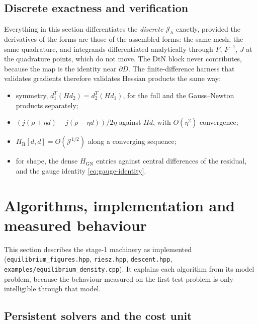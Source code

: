 \documentclass[11pt]{article}
\newcommand{\Jf}{\mathscr{J}}  %
\begin{document}
\subsection{Discrete exactness and verification}

Everything in this section differentiates the \emph{discrete} $\Jf _h$
exactly, provided the derivatives of the forms are those of the
assembled forms: the same mesh, the same quadrature, and integrands
differentiated analytically through $F$, $F^{-1}$, $J$ at the quadrature
points, which do not move. The DtN block never contributes, because the
map is the identity near $\partial D$. The finite-difference harness that
validates gradients therefore validates Hessian products the same way:
\begin{itemize}
\item symmetry, $d_1^{T}(Hd_2) = d_2^{T}(Hd_1)$, for the full and the
  Gauss--Newton products separately;
\item $(j(\rho + \eta d) - j(\rho - \eta d))/2\eta$ against $Hd$, with
  $O(\eta^2)$ convergence;
\item $H_{\mathrm{R}}[d,d] = O(\Jf ^{1/2})$ along a converging sequence;
\item for shape, the dense $H_{\mathrm{GN}}$ entries against central
  differences of the residual, and the gauge identity
  \eqref{eq:gauge-identity}.
\end{itemize}

\section{Algorithms, implementation and measured behaviour}
\label{sec:algorithms}

This section describes the stage-1 machinery as implemented
(\texttt{equilibrium\_figures.hpp}, \texttt{riesz.hpp},
\texttt{descent.hpp}, \texttt{examples/equilibrium\_density.cpp}). It
explains each algorithm from its model problem, because the behaviour
measured on the first test problem is only intelligible through that
model.

\subsection{Persistent solvers and the cost unit}
\end{document}

